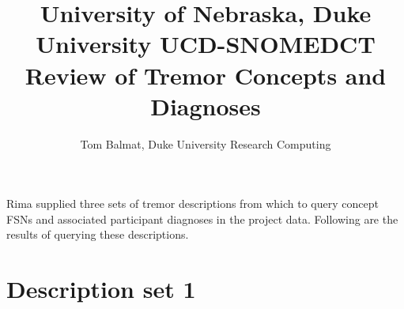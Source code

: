 \documentclass[10pt, letterpaper]{article}
\title{\large University of Nebraska, Duke University UCD-SNOMEDCT\\[8pt]
       \large Review of Tremor Concepts and Diagnoses\\[4pt]}
\date{}
\author{\normalsize Tom Balmat, Duke University Research Computing}
\begin{document}
    
\begin{spacing}{1.0}
    
\maketitle


Rima supplied three sets of tremor descriptions from which to query concept FSNs and associated participant diagnoses in the project data.  Following are the results of querying these descriptions.

\section*{Description set 1}


\end{spacing}
\end{document}
